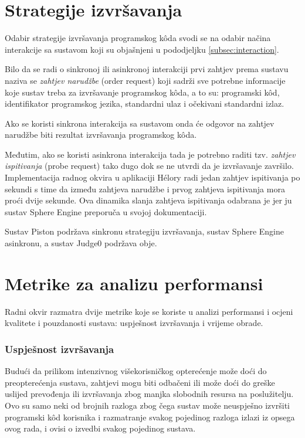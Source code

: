 \documentclass[times, utf8, diplomski]{fer}
\begin{document}
\section{Strategije izvršavanja}
Odabir strategije izvršavanja programskog kôda svodi se na odabir načina interakcije sa sustavom koji su objašnjeni u pododjeljku \ref{subsec:interaction}.

Bilo da se radi o sinkronoj ili asinkronoj interakciji prvi zahtjev prema sustavu naziva se \textit{zahtjev narudžbe} \engl(order request) koji sadrži sve potrebne informacije koje sustav treba za izvršavanje programskog kôda, a to su: programski kôd, identifikator programskog jezika, standardni ulaz i očekivani standardni izlaz.

Ako se koristi sinkrona interakcija sa sustavom onda će odgovor na zahtjev narudžbe biti rezultat izvršavanja programskog kôda. 

Međutim, ako se koristi asinkrona interakcija tada je potrebno raditi tzv. \textit{zahtjev ispitivanja} \engl(probe request) tako dugo dok se ne utvrdi da je izvršavanje završilo. Implementacija radnog okvira u aplikaciji Hélory radi jedan zahtjev ispitivanja po sekundi s time da između zahtjeva narudžbe i prvog zahtjeva ispitivanja mora proći dvije sekunde. Ova dinamika slanja zahtjeva ispitivanja odabrana je jer ju sustav Sphere Engine preporuča u svojoj dokumentaciji.

Sustav Piston podržava sinkronu strategiju izvršavanja, sustav Sphere Engine asinkronu, a sustav Judge0 podržava obje.

\section{Metrike za analizu performansi}
Radni okvir razmatra dvije metrike koje se koriste u analizi performansi i ocjeni kvalitete i pouzdanosti sustava: uspješnost izvršavanja i vrijeme obrade.

\subsubsection{Uspješnost izvršavanja}
Budući da prilikom intenzivnog višekorisničkog opterećenje može doći do preopterećenja sustava, zahtjevi mogu biti odbačeni ili može doći do greške uslijed prevođenja ili izvršavanja zbog manjka slobodnih resursa na poslužitelju. Ovo su samo neki od brojnih razloga zbog čega sustav može neuspješno izvršiti programski kôd korisnika i razmatranje svakog pojedinog razloga izlazi iz opsega ovog rada, i ovisi o izvedbi svakog pojedinog sustava.
\end{document}
